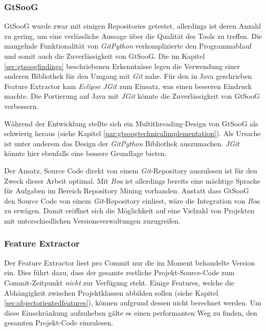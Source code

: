 \documentclass[10pt, a4paper]{article}
\begin{document}
\subsubsection{GtSooG}

GtSooG wurde zwar mit einigen Repositories getestet, allerdings ist deren Anzahl zu gering, um eine verlässliche Aussage über die Qualität des Tools zu treffen. Die mangelnde Funktionalität von \emph{GitPython} verkomplizierte den Programmablauf und somit auch die Zuverlässigkeit von GtSooG. Die im Kapitel \ref{sec:gtsoogfindings} beschriebenen Erkenntnisse legen die Verwendung einer anderen Bibliothek für den Umgang mit \emph{Git} nahe. Für den in Java geschrieben Feature Extractor kam \emph{Eclipse JGit} zum Einsatz, was einen besseren Eindruck machte. Die Portierung auf Java mit \emph{JGit} könnte die Zuverlässigkeit von GtSooG verbessern.

Während der Entwicklung stellte sich ein Multithreading-Design von GtSooG als schwierig heraus (siehe Kapitel \ref{par:gtsoogtechnicalimplementation}). Als Ursache ist unter anderem das Design der \emph{GitPython} Bibliothek auszumachen. \emph{JGit} könnte hier ebenfalls eine bessere Grundlage bieten.

Der Ansatz, Source Code direkt von einem \emph{Git}-Repository auszulesen ist für den Zweck dieser Arbeit optimal. Mit \emph{Boa} \cite{boahomepage} ist allerdings bereits eine mächtige Sprache für Aufgaben im Bereich Repository Mining vorhanden. Anstatt dass GtSooG den Source Code von einem \emph{Git}-Repository einliest, wäre die Integration von \emph{Boa} zu erwägen. Damit eröffnet sich die Möglichkeit auf eine Vielzahl von Projekten mit unterschiedlichen Versionsverwaltungen zuzugreifen.



\subsubsection{Feature Extractor}

Der Feature Extractor liest pro Commit nur die im Moment behandelte Version ein. Dies führt dazu, dass der gesamte restliche Projekt-Source-Code zum Commit-Zeitpunkt \emph{nicht} zur Verfügung steht. Einige Features, welche die Ab\-hän\-gig\-keit zwischen Projektklassen abbilden sollen (siehe Kapitel \ref{sec:objectorientedfeatures}), können aufgrund dessen nicht berechnet werden. Um diese Einschränkung aufzuheben gälte es einen performanten Weg zu finden, den gesamten Projekt-Code einzulesen.
\end{document}
